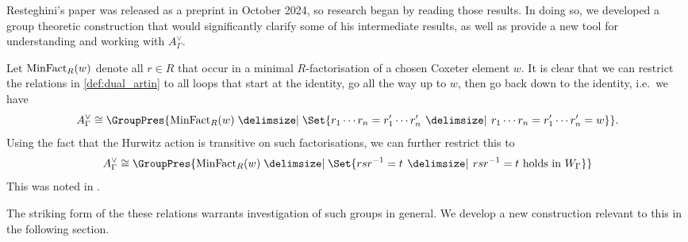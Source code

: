 Resteghini's paper \cite{resteghini_free_2024} was released as a preprint in October 2024, so research began by reading those results.
In doing so, we developed a group theoretic construction that would significantly clarify some of his intermediate results, as well as provide a new tool for understanding and working with $A^\vee_\Gamma$.

Let $\operatorname{MinFact}_R(w)$ denote all  $r \in R$ that occur in a minimal  $R$-factorisation of a chosen Coxeter element  $w$.
It is clear that we can restrict the relations in \cref{def:dual_artin} to all loops that start at the identity, go all the way up to $w$, then go back down to the identity, i.e.~we have
\[
	A^\vee_\Gamma \cong \GroupPres{ \minfact_R(w) \relations \Set{r_1\cdots r_n = r^\prime_1 \cdots r^\prime_n \given r_1 \cdots r_n = r^\prime_1 \cdots r^\prime_n = w}}
	.\]
Using the fact that the Hurwitz action is transitive on such factorisations, we can further restrict this to
\[
	A^\vee_\Gamma \cong \GroupPres{ \minfact_R(w) \relations \Set{rsr^{-1} = t \given rs r ^{-1} = t \text{ holds in } W_\Gamma}}
\]
This was noted in \cite[Lemma 7.11]{bessis_topology_2004}.

The striking form of the these relations warrants investigation of such groups in general.
We develop a new construction relevant to this in the following section.


